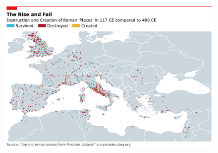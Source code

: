 \documentclass{article}
\begin{document}
\begin{figure}[htbp]
\centering
\includegraphics[width=1\linewidth]{outputs/figures/figure-2.pdf}
\caption{\label{fig:2}}
\end{figure}
\end{document}
